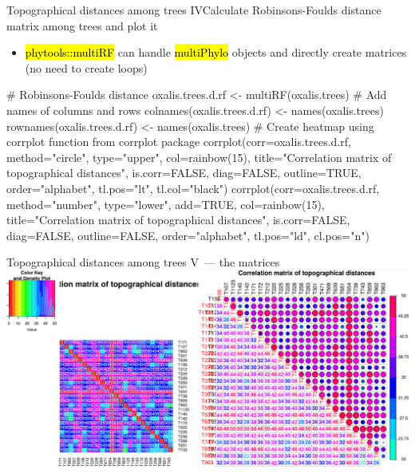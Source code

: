 \documentclass[compress, ucs, xelatex, 11pt, xcolor=svgnames,
  hyperref={
    bookmarks=true,
    unicode=true,
    colorlinks=true,
    pdftitle={Molecular data in R},
    plainpages=false,
    pdfauthor={Vojtech Zeisek},
    pdfsubject={Course about phylogeny and evolution in R},
    pdfcreator={XeLaTeX},
    pdfkeywords={R, evolution, phylogeny, molecular data},
    linkcolor=Tomato,
    anchorcolor=SaddleBrown,
    citecolor=Goldenrod,
    filecolor=DarkMagenta,
    menucolor=Sienna,
    urlcolor=DarkTurquoise,
    pdftex},
  url={hyphens, lowtilde} %
  ]{beamer}
\renewcommand{\texttt}[1]{\hl{\ttfamily #1}}
\begin{document}
\begin{frame}[fragile]{Topographical distances among trees IV}{Calculate Robinsons-Foulds distance matrix among trees and plot it}
  \begin{itemize}
    \item \texttt{phytools::multiRF} can handle \texttt{multiPhylo} objects and directly create matrices (no need to create loops)
  \end{itemize}
  \begin{spluscode}
    # Robinsons-Foulds distance
    oxalis.trees.d.rf <- multiRF(oxalis.trees)
    # Add names of columns and rows
    colnames(oxalis.trees.d.rf) <- names(oxalis.trees)
    rownames(oxalis.trees.d.rf) <- names(oxalis.trees)
    # Create heatmap using corrplot function from corrplot package
    corrplot(corr=oxalis.trees.d.rf, method="circle", type="upper",
      col=rainbow(15), title="Correlation matrix of topographical
      distances", is.corr=FALSE, diag=FALSE, outline=TRUE,
      order="alphabet", tl.pos="lt", tl.col="black")
    corrplot(corr=oxalis.trees.d.rf, method="number", type="lower",
      add=TRUE, col=rainbow(15), title="Correlation matrix of
      topographical distances", is.corr=FALSE, diag=FALSE,
      outline=FALSE, order="alphabet", tl.pos="ld", cl.pos="n")
  \end{spluscode}
\end{frame}

\begin{frame}{Topographical distances among trees V~--- the matrices}
  \includegraphics[width=\textwidth]{oxalis-dist.png}
\end{frame}
\end{document}
